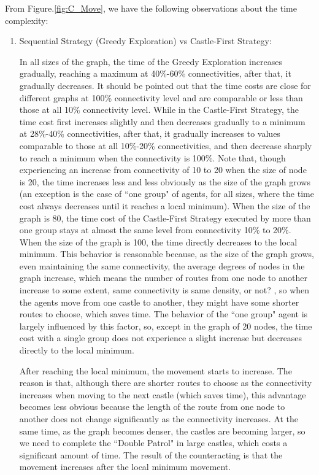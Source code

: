 From Figure.\ref{fig:C_Move}, we have the following observations about the  time complexity:
\begin{enumerate}
\item Sequential Strategy ({\sc Greedy} Exploration) vs {\sc Castle-First} Strategy: 

In all sizes of the graph, the time of the {\sc Greedy} Exploration increases gradually, reaching a maximum at 40\%-60\% connectivities, after that, it gradually decreases. It should be pointed out that the time costs are close for different graphs at 100\% connectivity level and are comparable or less than those at all 10\% connectivity level. While in the {\sc Castle-First} Strategy, the time cost first increases slightly and then decreases gradually to a minimum at 28\%-40\% connectivities, after that, it gradually increases to values comparable to those at all 10\%-20\% connectivities, and then decrease sharply to reach a minimum when the connectivity is 100\%. Note that,  though experiencing an increase from connectivity of 10 to 20 when the size of node is 20, the time increases less and less obviously as the size of the graph grows (an exception is the case of  ``one group" of agents, for  all sizes,  where  the time cost    always decreases   until it reaches a local minimum). When the size of the graph is 80, the time cost of the {\sc Castle-First} Strategy executed by more than one group stays at almost the same level from connectivity   10\% to 20\%. When the size of the graph is 100, the time directly decreases to the local minimum. This behavior is reasonable because,  as the size of the graph grows, even maintaining the same connectivity, the average degrees of nodes in the graph increase, which means the number of routes from one node to another increase to some extent, \color{blue} same connectivity is same density, or not? \color{black}, so when the agents move from one castle to another, they might have some shorter routes to choose, which saves time. The behavior of the ``one group" agent is largely influenced by this factor, so,  except in the graph of 20 nodes, the time cost with a single group does not experience a  slight increase but decreases directly to the local minimum.

After reaching the local minimum, the movement starts to increase. The reason is that, although there are shorter routes to choose as the connectivity increases when moving to the next castle (which saves time),  this advantage becomes less obvious because the length of the route from one node to another does not change significantly
 as the connectivity increases. At the same time, as the graph becomes denser, the castles are becoming larger, so we need to complete the ``Double Patrol" in large castles, which costs a significant amount of time. The result of the counteracting is that the movement increases after the local minimum movement. 


\end{enumerate}
